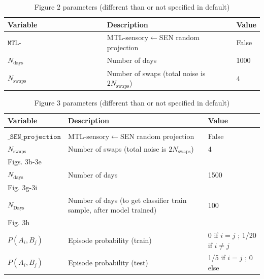 \documentclass{article}
\begin{document}
\begin{table}[ht]
\centering
\caption{Figure 2 parameters (different than or not specified in default)}
\label{tab:figure_2}
\begin{tabular}{lll}
\toprule
\textbf{Variable} & \textbf{Description} & \textbf{Value} \\
\midrule
$\texttt{MTL-sensory\_SEN\_projection}$ & MTL-sensory$\leftarrow$SEN random projection & False \\
$N_\textrm{days}$ & Number of days & 1000 \\
$N_\textrm{swaps}$ & Number of swaps (total noise is $2N_\textrm{swaps}$) & 4 \\
\bottomrule
\end{tabular}
\end{table}

\begin{table}[ht]
\centering
\caption{Figure 3 parameters (different than or not specified in default)}
\label{tab:figure_3}
\begin{tabular}{lll}
\toprule
\textbf{Variable} & \textbf{Description} & \textbf{Value} \\
\midrule
\makecell{$\texttt{MTL-sensory}$\\$\texttt{\_SEN\_projection}$} & MTL-sensory$\leftarrow$SEN random projection & False \\
$N_\textrm{swaps}$ & Number of swaps (total noise is $2N_\textrm{swaps}$) & 4 \\
\midrule
Figs. 3b-3e & & \\
$N_\textrm{days}$ & Number of days & 1500 \\
\midrule
Fig. 3g-3i & & \\
$N_\textrm{Days}$ & Number of days (to get classifier train sample, after model trained) & 100 \\
\midrule
Fig. 3h & & \\
$P(A_i, B_j)$ & Episode probability (train) & 0 if $i=j$ ; 1/20 if $i\neq j$ \\
$P(A_i, B_j)$ & Episode probability (test) & 1/5 if $i=j$ ; 0 else \\
\bottomrule
\end{tabular}
\end{table}
\end{document}
